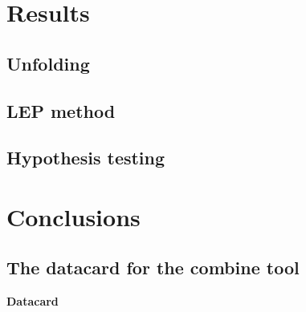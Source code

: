 \documentclass[titlepage, a4paper]{report}
\renewcommand{\normalsize}{\fontsize{12pt}{13.4pt}\selectfont}
\begin{document}
\chapter{Results}
\label{chap:results}


\section{Unfolding}


\clearpage
\section{LEP method}


\clearpage
\section{Hypothesis testing}


\chapter{Conclusions}


\appendix
{
      \begin{landscape}
        \chapter{The datacard for the combine tool}
        \label{a:datacard}
        \textbf{Datacard}\\
        \footnotesize
        
        \normalsize
      \end{landscape}
      
}
\clearpage
\printbibliography[heading=bibintoc]
\end{document}
